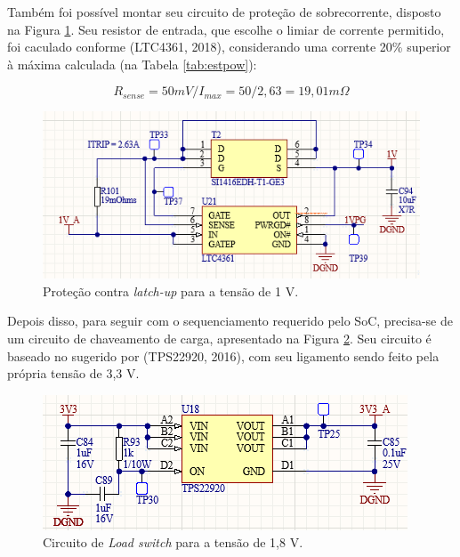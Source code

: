 Também foi possível montar seu circuito de proteção de sobrecorrente, disposto na Figura \ref{fig:1vocp}. Seu resistor de entrada, que escolhe o limiar de corrente permitido, foi caculado conforme (LTC4361, 2018), considerando uma corrente 20\% superior à máxima calculada (na Tabela \ref{tab:estpow}):

\begin{equation}
	R_{sense} = 50 mV / I_{max} =50 / 2,63 = 19,01 m\Omega
\end{equation} 

\begin{figure}[H]
    \centering
    \includegraphics[scale=1]{images/1vocp.png}
    \caption{Proteção contra \textit{latch-up} para a tensão de 1 V.}
    \label{fig:1vocp}
\end{figure}

Depois disso, para seguir com o sequenciamento requerido pelo SoC, precisa-se de um circuito de chaveamento de carga, apresentado na Figura \ref{fig:sw1}. Seu circuito é baseado no sugerido por (TPS22920, 2016), com seu ligamento sendo feito pela própria tensão de 3,3 V.

\begin{figure}[H]
    \centering
    \includegraphics[scale=1]{images/sw1.png}
    \caption{Circuito de \textit{Load switch} para a tensão de 1,8 V.}
    \label{fig:sw1}
\end{figure}

